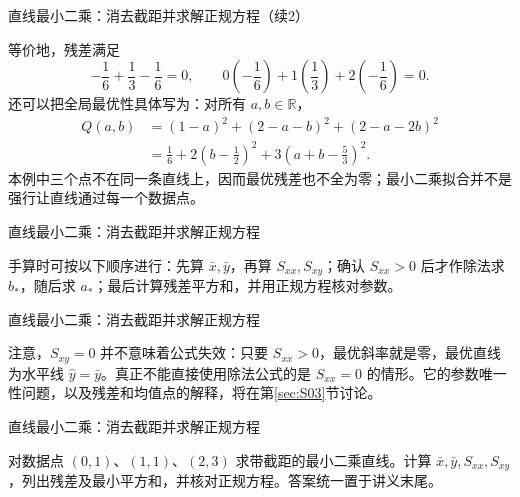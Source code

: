 \documentclass[aspectratio=169,10pt,fontset=fandol]{ctexbeamer}
\begin{document}
\begin{frame}[t,fragile]{直线最小二乘：消去截距并求解正规方程（续2）}
\footnotesize
{\footnotesize
等价地，残差满足
\[
-\frac16+\frac13-\frac16=0,\qquad
0\left(-\frac16\right)+1\left(\frac13\right)+2\left(-\frac16\right)=0.
\]
还可以把全局最优性具体写为：对所有 $a,b\in\mathbb{R}$，
\[
\begin{aligned}
Q(a,b)&=(1-a)^2+(2-a-b)^2+(2-a-2b)^2\\
&=\frac16+2\left(b-\frac12\right)^2+3\left(a+b-\frac53\right)^2.
\end{aligned}
\]
本例中三个点不在同一条直线上，因而最优残差也不全为零；最小二乘拟合并不是强行让直线通过每一个数据点。\par

}
\end{frame}
\begin{frame}[t,fragile]{直线最小二乘：消去截距并求解正规方程}
\footnotesize
{\footnotesize
手算时可按以下顺序进行：先算 $\bar{x},\bar{y}$，再算 $S_{xx},S_{xy}$；确认 $S_{xx}>0$ 后才作除法求 $b_*$，随后求 $a_*$；最后计算残差平方和，并用正规方程核对参数。


}
\end{frame}
\begin{frame}[t,fragile]{直线最小二乘：消去截距并求解正规方程}
\footnotesize
{\footnotesize
注意，$S_{xy}=0$ 并不意味着公式失效：只要 $S_{xx}>0$，最优斜率就是零，最优直线为水平线 $\hat{y}=\bar{y}$。真正不能直接使用除法公式的是 $S_{xx}=0$ 的情形。它的参数唯一性问题，以及残差和均值点的解释，将在第\ref{sec:S03}节讨论。\par

}
\end{frame}
\begin{frame}[t,fragile]{直线最小二乘：消去截距并求解正规方程}
\normalsize
{\normalsize
\begin{exercise}
\label{mathagent:exercise:332ae2e99c79cf97370ba4732967ff23f2a2c4a4b36b98eda8e910755bf43b8b}
对数据点 $(0,1)$、$(1,1)$、$(2,3)$ 求带截距的最小二乘直线。计算 $\bar{x},\bar{y},S_{xx},S_{xy}$，列出残差及最小平方和，并核对正规方程。答案统一置于讲义末尾。
\end{exercise}
}
\end{frame}
\end{document}
